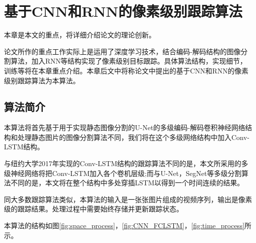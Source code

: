
\chapter{基于CNN和RNN的像素级别跟踪算法}
本章是本文的重点，将详细介绍论文的理论创新。
\par
论文所作的重点工作实际上是运用了深度学习技术，结合编码-解码结构的图像分割算法，加入RNN等结构实现了像素级别目标跟踪。具体算法结构，实现细节，训练等将在本章重点介绍。本章后文中将称论文中提出的基于CNN和RNN的像素级别跟踪算法为本算法。

\section{算法简介}
本算法将首先基于用于实现静态图像分割的U-Net\supercite{ronneberger2015u}的多级编码-解码卷积神经网络结构和处理静态图片的图像分割算法不同，我们将在这个多级网络结构中加入Conv-LSTM结构。
\par
与纽约大学2017年实现的Conv-LSTM结构的跟踪算法不同的是，本文所采用的多级神经网络将把Conv-LSTM加入各个卷机层级;而与U-Net，SegNet等多级分割算法不同的是，本文将在整个结构中多处穿插LSTM以得到一个时间连续的结果。
\par
同大多数跟踪算法类似，本算法的输入是一张张图片组成的视频序列，输出是像素级的跟踪结果。处理过程中需要始终存储并更新跟踪状态。
\par
本算法的结构如图\ref{fig:space_process}，\ref{fig:CNN_FCLSTM}，\ref{fig:time_process}所示。

